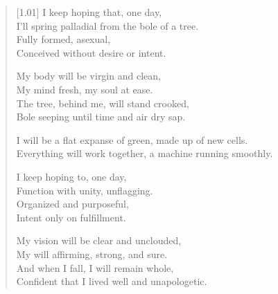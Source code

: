 \begin{verse}[1.01\textwidth]
  I keep hoping that, one day,\\
  I'll spring palladial from the bole of a tree.\\
  Fully formed, asexual,\\
  Conceived without desire or intent.

  My body will be virgin and clean,\\
  My mind fresh, my soul at ease.\\
  The tree, behind me, will stand crooked,\\
  Bole seeping until time and air dry sap.

  I will be a flat expanse of green, made up of new cells.\\
  Everything will work together, a machine running smoothly.

  I keep hoping to, one day,\\
  Function with unity, unflagging.\\
  Organized and purposeful,\\
  Intent only on fulfillment.

  My vision will be clear and unclouded,\\
  My will affirming, strong, and sure.\\
  And when I fall, I will remain whole,\\
  Confident that I lived well and unapologetic.
\end{verse}
